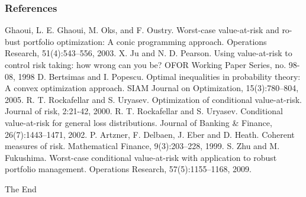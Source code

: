 \documentclass{beamer}
\begin{document}
\begin{frame}
\frametitle{References}
\footnotesize{
\begin{thebibliography}{99} %
 Ghaoui, L. E. Ghaoui, M. Oks, and F. Oustry. Worst-case value-at-risk and ro-
bust portfolio optimization: A conic programming approach. Operations Research, 51(4):543–556, 2003.
 X. Ju and N. D. Pearson. Using value-at-risk to control risk taking: how wrong can you be? OFOR Working Paper Series, no. 98-08, 1998
 D. Bertsimas and I. Popescu. Optimal inequalities in probability theory: A convex optimization approach. SIAM Journal on Optimization, 15(3):780–804, 2005.
 R. T. Rockafellar and S. Uryasev. Optimization of conditional value-at-risk. Journal of risk, 2:21-42, 2000.
 R. T. Rockafellar and S. Uryasev. Conditional value-at-risk for general loss distributions. Journal of Banking \& Finance, 26(7):1443--1471, 2002.
 P. Artzner, F. Delbaen, J. Eber and D. Heath. Coherent measures of risk. Mathematical Finance, 9(3):203--228, 1999.
 S. Zhu and M. Fukushima. Worst-case conditional value-at-risk with application to robust portfolio management. Operations Research, 57(5):1155--1168, 2009.

\end{thebibliography}
}
\end{frame}


\begin{frame}
\Huge{\centerline{The End}}
\end{frame}

\end{document}
